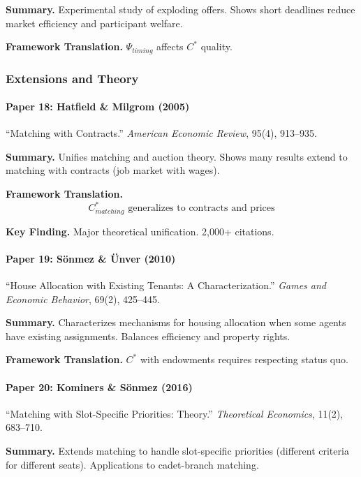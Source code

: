 \textbf{Summary.}
Experimental study of exploding offers. Shows short deadlines reduce 
market efficiency and participant welfare.

\textbf{Framework Translation.}
$\Psi_{timing}$ affects $C^*$ quality.

\subsubsection{Extensions and Theory}

\paragraph{Paper 18: Hatfield \& Milgrom (2005)}

``Matching with Contracts.''
\textit{American Economic Review}, 95(4), 913--935.

\textbf{Summary.}
Unifies matching and auction theory. Shows many results extend to 
matching with contracts (job market with wages).

\textbf{Framework Translation.}
\begin{equation}
C^*_{matching} \text{ generalizes to contracts and prices}
\end{equation}

\textbf{Key Finding.}
Major theoretical unification. 2,000+ citations.

\paragraph{Paper 19: Sönmez \& Ünver (2010)}

``House Allocation with Existing Tenants: A Characterization.''
\textit{Games and Economic Behavior}, 69(2), 425--445.

\textbf{Summary.}
Characterizes mechanisms for housing allocation when some agents have 
existing assignments. Balances efficiency and property rights.

\textbf{Framework Translation.}
$C^*$ with endowments requires respecting status quo.

\paragraph{Paper 20: Kominers \& Sönmez (2016)}

``Matching with Slot-Specific Priorities: Theory.''
\textit{Theoretical Economics}, 11(2), 683--710.

\textbf{Summary.}
Extends matching to handle slot-specific priorities (different criteria 
for different seats). Applications to cadet-branch matching.

